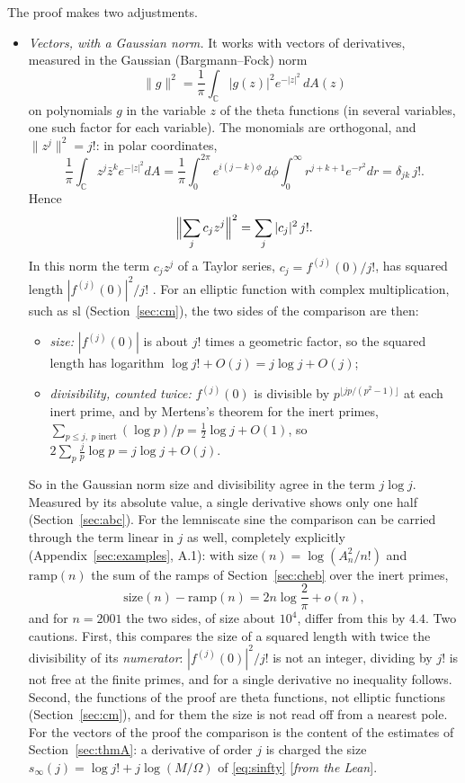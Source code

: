 \documentclass[11pt]{amsart}
\numberwithin{equation}{section}
\theoremstyle{definition}
\theoremstyle{remark}
\newcommand{\C}{\mathbb C}
\renewcommand{\sl}{\mathrm{sl}}
\newcommand{\status}[1]{\textup{[\emph{#1}]}}
\begin{document}
The proof makes two adjustments.
\begin{itemize}[leftmargin=2em]
\item \emph{Vectors, with a Gaussian norm.} It works with vectors of derivatives, measured in the Gaussian (Bargmann--Fock) norm
\begin{equation}
 \|g\|^2=\frac1\pi\int_{\C}|g(z)|^2e^{-|z|^2}\,dA(z)
\end{equation}
on polynomials $g$ in the variable $z$ of the theta functions (in several variables, one such factor for each variable). The monomials are orthogonal, and $\|z^j\|^2=j!$: in polar coordinates,
\begin{equation}
 \frac1\pi\int_{\C}z^j\bar z^ke^{-|z|^2}dA=\frac1\pi\int_0^{2\pi}e^{i(j-k)\phi}\,d\phi\int_0^\infty r^{j+k+1}e^{-r^2}dr=\delta_{jk}\,j!.
\end{equation}
Hence
\begin{equation}
 \Bigl\|\sum_jc_jz^j\Bigr\|^2=\sum_j|c_j|^2\,j!.
\end{equation}
 In this norm the term $c_jz^j$ of a Taylor series, $c_j=f^{(j)}(0)/j!$, has squared length $|f^{(j)}(0)|^2/j!$ \cite{bargmann}. For an elliptic function with complex multiplication, such as $\sl$ (Section~\ref{sec:cm}), the two sides of the comparison are then:
\begin{itemize}[leftmargin=1.5em]
\item \emph{size:} $|f^{(j)}(0)|$ is about $j!$ times a geometric factor, so the squared length has logarithm $\log j!+O(j)=j\log j+O(j)$;
\item \emph{divisibility, counted twice:} $f^{(j)}(0)$ is divisible by $p^{\lfloor jp/(p^2-1)\rfloor}$ at each inert prime, and by Mertens's theorem for the inert primes, $\sum_{p\le j,\ p\text{ inert}}(\log p)/p=\frac12\log j+O(1)$, so $2\sum_p\frac jp\log p=j\log j+O(j)$.
\end{itemize}
So in the Gaussian norm size and divisibility agree in the term $j\log j$. Measured by its absolute value, a single derivative shows only one half (Section~\ref{sec:abc}). For the lemniscate sine the comparison can be carried through the term linear in $j$ as well, completely explicitly (Appendix~\ref{sec:examples}, A.1): with $\mathrm{size}(n)=\log(A_n^2/n!)$ and $\mathrm{ramp}(n)$ the sum of the ramps of Section~\ref{sec:cheb} over the inert primes,
\begin{equation}\label{eq:normpreview}
 \mathrm{size}(n)-\mathrm{ramp}(n)=2n\log\frac2\pi+o(n),
\end{equation}
and for $n=2001$ the two sides, of size about $10^4$, differ from this by $4.4$. Two cautions. First, this compares the size of a squared length with twice the divisibility of its \emph{numerator}: $|f^{(j)}(0)|^2/j!$ is not an integer, dividing by $j!$ is not free at the finite primes, and for a single derivative no inequality follows. Second, the functions of the proof are theta functions, not elliptic functions (Section~\ref{sec:cm}), and for them the size is not read off from a nearest pole. For the vectors of the proof the comparison is the content of the estimates of Section~\ref{sec:thmA}: a derivative of order $j$ is charged the size $s_\infty(j)=\log j!+j\log(M/\Omega)$ of \eqref{eq:sinfty} \status{from the Lean}.

\end{itemize}
\end{document}
